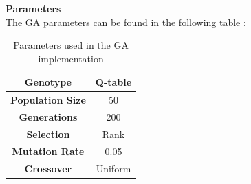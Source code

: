 \textbf{Parameters}\\
The GA parameters can be found in the following table :
\begin{table}[htb]%
	\centering
	\caption{Parameters used in the GA implementation}
	\label{tab:GA_parameters}
	\begin{tabular}{|S|S|} 		%
		
		\hline
		{\textbf{Genotype}} &  {Q-table} \\
		\hline
		{\textbf{Population Size}} & {50} \\
		\hline
		{\textbf{Generations}} & {200} \\
		\hline
		{\textbf{Selection}}  & {Rank} \\
		\hline
		{\textbf{Mutation Rate}} & {0.05} \\
		\hline
		{\textbf{Crossover}}& {Uniform} \\
		\hline

	\end{tabular}
\end{table}


